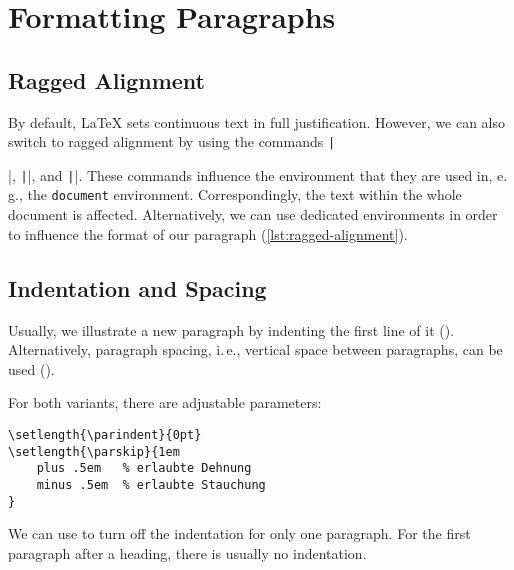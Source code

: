 \chapter{Formatting Paragraphs} %
\label{sec:formatting-paragraphs}

\section*{Ragged Alignment}
\label{sec:ragged-alignment}
By default, \LaTeX{} sets continuous text in full justification. 
However, we can also switch to ragged alignment by using the commands 
\texttt|\raggedright|, \texttt|\raggedleft|, and 
\texttt|\centering|. 
These commands influence the environment that they are used in, e.\,g., the 
\texttt{document} environment. Correspondingly, the text within the whole 
document is affected. 
Alternatively, we can use dedicated environments in order to influence the 
format 
of our paragraph (\cref{lst:ragged-alignment}).


\section*{Indentation and Spacing}
\label{sec:indents-and-parskips}
Usually, we illustrate a new paragraph by indenting the first line of it 
(\texttt{\parindent}). 
Alternatively, paragraph spacing, i.\,e., vertical space between paragraphs, 
can be used (\texttt{\parskip}).

For both variants, there are adjustable parameters:
\begin{verbatim}
\setlength{\parindent}{0pt}
\setlength{\parskip}{1em
    plus .5em   % erlaubte Dehnung
    minus .5em  % erlaubte Stauchung
}
\end{verbatim}

We can use \texttt{\noindent} to turn off the indentation for only one 
paragraph. 
For the first paragraph after a heading, there is usually no indentation. 

